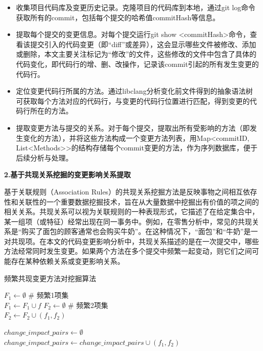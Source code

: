 \begin{itemize}
    \item 收集项目代码库及变更历史记录。克隆项目的代码库到本地，通过git log命令获取所有的commit，包括每个提交的哈希值commitHash等信息。
    \item 提取每个提交的变更信息。对每个提交运行git show <commitHash>命令，查看该提交引入的代码变更（即“diff”或差异），这会显示哪些文件被修改、添加或删除，本文主要关注标记为“修改”的文件，这些修改的文件中包含了具体的代码变化，即代码行的增、删、改操作，记录该commit引起的所有发生变更的代码行。
    \item 定位变更代码行所属的方法。通过libclang分析变化前文件得到的抽象语法树可获取每个方法对应的代码行，与变更的代码行位置进行匹配，得到变更的代码行所在的方法。
    \item 提取变更方法与提交的关系。对于每个提交，提取出所有受影响的方法（即发生变化的方法），并将这些方法构成一个变更方法列表，用Map<commitID, List<Methods>>的结构存储每个commit变更的方法，作为序列数据库，便于后续分析与处理。
    
\end{itemize}

\noindent \textbf{2.基于共现关系挖掘的变更影响关系提取}

基于关联规则（Association Rules）的共现关系挖掘方法是反映事物之间相互依存性和关联性的一个重要数据挖掘技术，旨在从大量数据中挖掘出有价值的项之间的相关关系。共现关系可以视为关联规则的一种表现形式，它描述了在给定集合中，某一组项（或特征）经常出现在同一事务中。例如，在零售分析中，常见的共现关系是“购买了面包的顾客通常也会购买牛奶”。在这种情况下，“面包”和“牛奶”是一对共现项。在本文的代码变更影响分析中，共现关系描述的是在一次提交中，哪些方法经常同时发生变更。如果两个方法在多个提交中频繁一起变动，则它们之间可能存在某种依赖关系或变更影响关系。

\begin{algorithm}[h]
    \caption{频繁共现变更方法对挖掘算法}
    \label{同时变更方法对挖掘算法}
     $F_1 \gets \emptyset$  \# 频繁1项集\\  
     {
         {
            $F_1 \gets F_1 \cup f$
        }
    } 
    $F_2 \gets \emptyset$  \# 频繁2项集\\ 
     {
         {
            $F_2 \gets F_2 \cup (f_1, f_2)$
        }
    }
    
    $change\_impact\_pairs \gets \emptyset$ \\ 
     {
         {
            $change\_impact\_pairs \gets change\_impact\_pairs \cup (f_1, f_2)$
        }
    }
    \end{algorithm}


